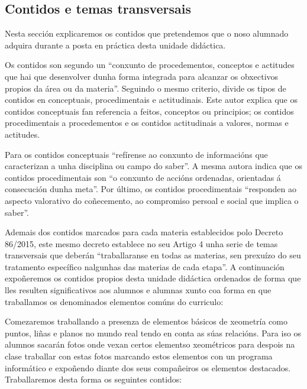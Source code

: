 \subsection{Contidos e temas transversais}\label{sec:contidos}

Nesta sección explicaremos os contidos que pretendemos que o noso alumnado adquira durante a posta en práctica desta unidade didáctica.

Os contidos son segundo \cite{orientacionesgobvasco} un ``conxunto de procedementos, conceptos e actitudes que hai que desenvolver dunha forma integrada para alcanzar os obxectivos propios da área ou da materia''. Seguindo o mesmo criterio,  divide os tipos de contidos en conceptuais, procedimentais e actitudinais. Este autor explica que os contidos conceptuais fan referencia a feitos, conceptos ou principios; os contidos procedimentais a procedementos e os contidos actitudinais a valores, normas e actitudes.

Para  os contidos conceptuais ``refírense ao conxunto de informacións que caracterizan a unha disciplina ou campo do saber''. A mesma autora indica que os contidos procedimentais son ``o conxunto de accións ordenadas, orientadas á consecución dunha meta''. Por último, os contidos procedimentais ``responden ao aspecto valorativo do coñecemento, ao compromiso persoal e social que implica o saber''.

Ademais dos contidos marcados para cada materia establecidos polo Decreto 86/2015, este mesmo decreto establece no seu Artigo 4 unha serie de temas transversais que deberán ``traballaranse en todas as materias, sen prexuízo do seu tratamento específico nalgunhas das materias de cada etapa''. A continuación expoñeremos os contidos propios desta unidade didáctica ordenados de forma que lles resulten significativos aos alumnos e alumnas xunto coa forma en que traballamos os denominados elementos comúns do curriculo:

Comezaremos traballando a presenza de elementos básicos de xeometría como puntos, liñas e planos no mundo real tendo en conta as súas relacións. Para iso os alumnos sacarán fotos onde vexan certos elementso xeométricos para despois na clase traballar con estas fotos marcando estos elementos con un programa informático e expoñendo diante dos seus compañeiros os elementos destacados. Traballaremos desta forma os seguintes contidos:

